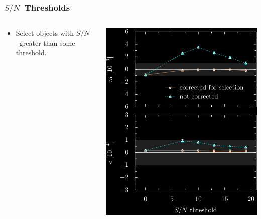 \documentclass{beamer}
\newcommand{\snr}{$S/N$}
\begin{document}
\frame
{
    \frametitle{\snr\ Thresholds}
 

    \begin{columns}
        \begin{column}{0.4\textwidth}
            \begin{itemize}
                \item Select objects with \snr\ greater than some threshold.
            \end{itemize}
        \end{column}
        \begin{column}{0.6\textwidth}
            \begin{center}
            \includegraphics[width=\textwidth]{mc-select-bias-thresh-pyx-inv.png}
                \newline
            \end{center}
        \end{column}
    \end{columns}


}
\end{document}
